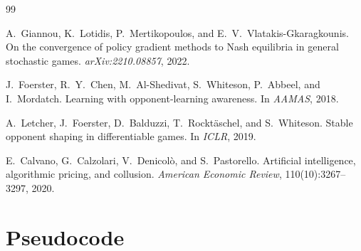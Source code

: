\documentclass[11pt,a4paper]{article}
\begin{document}
\begin{thebibliography}{99}

A.~Giannou, K.~Lotidis, P.~Mertikopoulos, and E.~V.~Vlatakis-Gkaragkounis.
\newblock On the convergence of policy gradient methods to {N}ash equilibria in general stochastic games.
\newblock \emph{arXiv:2210.08857}, 2022.

J.~Foerster, R.~Y.~Chen, M.~Al-Shedivat, S.~Whiteson, P.~Abbeel, and I.~Mordatch.
\newblock Learning with opponent-learning awareness.
\newblock In \emph{AAMAS}, 2018.

A.~Letcher, J.~Foerster, D.~Balduzzi, T.~Rockt{\"a}schel, and S.~Whiteson.
\newblock Stable opponent shaping in differentiable games.
\newblock In \emph{ICLR}, 2019.

E.~Calvano, G.~Calzolari, V.~Denicol{\`o}, and S.~Pastorello.
\newblock Artificial intelligence, algorithmic pricing, and collusion.
\newblock \emph{American Economic Review}, 110(10):3267--3297, 2020.

\end{thebibliography}


\appendix
\section{Pseudocode}\label{app:algorithms}
\end{document}
